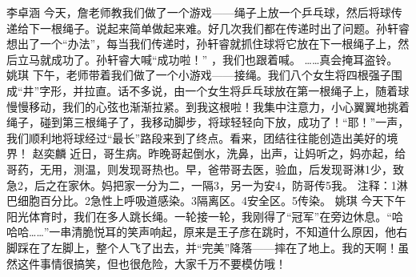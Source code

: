 {}\markdownRendererInterblockSeparator
{}李卓涵\markdownRendererInterblockSeparator
{}今天，詹老师教我们做了一个游戏——绳子上放一个乒乓球，然后将球传递给下一根绳子。说起来简单做起来难。好几次我们都在传递时出了问题。孙轩睿想出了一个“办法”，每当我们传递时，孙轩睿就抓住球将它放在下一根绳子上，然后立马就成功了。孙轩睿大喊“成功啦！” ，我们也跟着喊。 ……真会掩耳盗铃。\markdownRendererInterblockSeparator
{}\markdownRendererInterblockSeparator
{}姚琪\markdownRendererInterblockSeparator
{}下午，老师带着我们做了一个小游戏——接绳。我们八个女生将四根强子围成“井”字形，并拉直。话不多说，由一个女生将乒乓球放在第一根绳子上，随着球慢慢移动，我们的心弦也渐渐拉紧。到我这根啦！我集中注意力，小心翼翼地挑着绳子，碰到第三根绳子了，我移动脚步，将球轻轻向下放，成功了！“耶！”一声，我们顺利地将球经过“最长”路段来到了终点。看来，团结往往能创造出美好的境界！\markdownRendererInterblockSeparator
{}\markdownRendererInterblockSeparator
{}赵奕麟\markdownRendererInterblockSeparator
{}近日，哥生病。昨晚哥起倒水，洗鼻，出声，让妈听之，妈亦起，给哥药，无用，测温，则发现哥热也。早，爸带哥去医，验血，后发现哥淋1少，致急2，后之在家休。妈把家一分为二，一隔3，另一为安4，防哥传5我。\markdownRendererInterblockSeparator
{}注释：1淋巴细胞百分比。2急性上呼吸道感染。3隔离区。4安全区。5传染。\markdownRendererInterblockSeparator
{}\markdownRendererInterblockSeparator
{}姚琪\markdownRendererInterblockSeparator
{}今天下午阳光体育时，我们在多人跳长绳。一轮接一轮，我刚得了“冠军”在旁边休息。“哈哈哈……”一串清脆悦耳的笑声响起，原来是王子彦在跳时，不知道什么原因，他右脚踩在了左脚上，整个人飞了出去，并“完美”降落——摔在了地上。我的天啊！虽然这件事情很搞笑，但也很危险，大家千万不要模仿哦！\relax